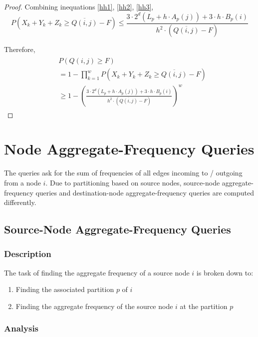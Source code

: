 \begin{proof}
Combining inequations \ref{hh1}, \ref{hh2}, \ref{hh3},
\begin{equation}
  P(X_k + Y_k + Z_k \geq \overline{Q(i,j)}-F) \leq \frac{3\cdot2^d(L_p+h\cdot A_p(j)) + 3\cdot h\cdot B_p(i)}{h^2\cdot (\overline{Q(i,j)}-F)}
\end{equation}

Therefore,
\begin{align}
\begin{split}
&  P(Q(i,j) \geq F)
\\  &= 1 - \prod _{k=1}^{w}P(X_k + Y_k + Z_k \geq \overline{Q(i,j)}-F)
\\  &\geq 1-(\frac{3\cdot2^d(L_p+h\cdot A_p(j)) + 3\cdot h\cdot B_p(i)}{h^2\cdot (\overline{Q(i,j)}-F)})^w
\end{split}
\end{align}

\end{proof}

\section{Node Aggregate-Frequency Queries}

The queries ask for the sum of frequencies of all edges incoming to / outgoing from a node $i$. Due to partitioning based on source nodes, source-node aggregate-frequency queries and destination-node aggregate-frequency queries are computed differently.

\subsection{Source-Node Aggregate-Frequency Queries}

\subsubsection{Description}
The task of finding the aggregate frequency of a source node $i$ is broken down to:

\begin{enumerate}
\item Finding the associated partition $p$ of $i$
\item Finding the aggregate frequency of the source node $i$ at the partition $p$
\end{enumerate}

\subsubsection{Analysis}

